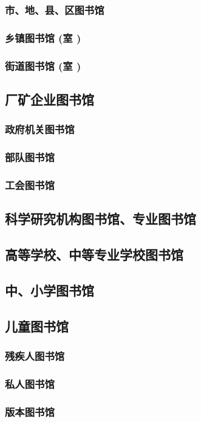 \documentclass[UTF8]{../../ApplicationUniverse}
\begin{document}
    \subsubsection{市、地、县、区图书馆}
    \subsubsection{乡镇图书馆 (室 )}
    \subsubsection{街道图书馆 (室 )}
\subsection{厂矿企业图书馆}
    \subsubsection{政府机关图书馆}
    \subsubsection{部队图书馆}
    \subsubsection{工会图书馆}
\subsection{科学研究机构图书馆、专业图书馆}
\subsection{高等学校、中等专业学校图书馆}
\subsection{中、小学图书馆}
\subsection{儿童图书馆}
    \subsubsection{残疾人图书馆}
    \subsubsection{私人图书馆}
    \subsubsection{版本图书馆}
\end{document}
